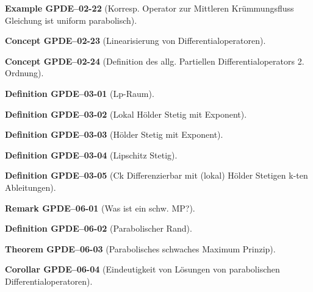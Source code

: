 \documentclass[10pt, letterpaper]{article}
\newcommand{\CustomHeading}[3]{%
  \par\medskip\noindent%
  \textbf{#1 #2} \textnormal{(#3)}.\enskip%
}
\newenvironment{DEF}[2]{\CustomHeading{Definition}{#1}{#2}}{}
\newenvironment{THEO}[2]{\CustomHeading{Theorem}{#1}{#2}}{}
\newenvironment{KORO}[2]{\CustomHeading{Corollar}{#1}{#2}}{}
\newenvironment{REM}[2]{\CustomHeading{Remark}{#1}{#2}}{}
\newenvironment{EXA}[2]{\CustomHeading{Example}{#1}{#2}}{}
\newenvironment{CONC}[2]{\CustomHeading{Concept}{#1}{#2}}{}
\begin{document}
\begin{EXA}{GPDE--02-22}{Korresp. Operator zur Mittleren Krümmungsfluss Gleichung ist uniform parabolisch}
\end{EXA}

\begin{CONC}{GPDE--02-23}{Linearisierung von Differentialoperatoren}
\end{CONC}

\begin{CONC}{GPDE--02-24}{Definition des allg. Partiellen Differentialoperators 2. Ordnung}
\end{CONC}

\begin{DEF}{GPDE--03-01}{Lp-Raum}
\end{DEF}

\begin{DEF}{GPDE--03-02}{Lokal Hölder Stetig mit Exponent}
\end{DEF}

\begin{DEF}{GPDE--03-03}{Hölder Stetig mit Exponent}
\end{DEF}

\begin{DEF}{GPDE--03-04}{Lipschitz Stetig}
\end{DEF}

\begin{DEF}{GPDE--03-05}{Ck Differenzierbar mit (lokal) Hölder Stetigen k-ten Ableitungen}
\end{DEF}

\begin{REM}{GPDE--06-01}{Was ist ein schw. MP?}
\end{REM}

\begin{DEF}{GPDE--06-02}{Parabolischer Rand}
\end{DEF}

\begin{THEO}{GPDE--06-03}{Parabolisches schwaches Maximum Prinzip}
\end{THEO}

\begin{KORO}{GPDE--06-04}{Eindeutigkeit von Lösungen von parabolischen Differentialoperatoren}
\end{KORO}
\end{document}
